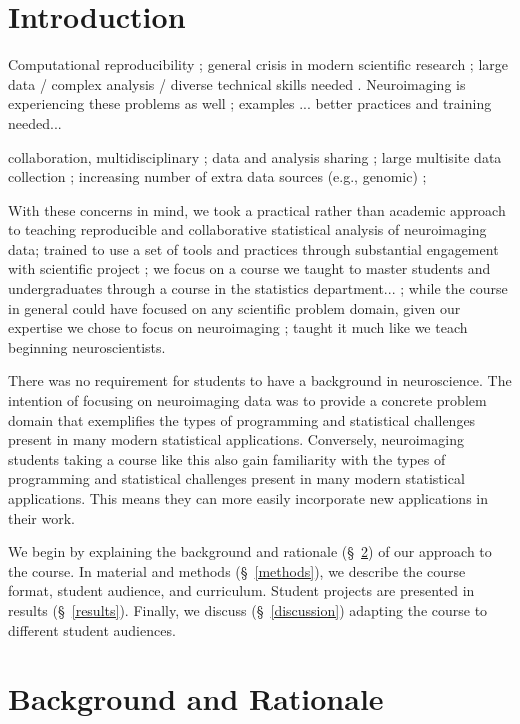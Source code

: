 \section{Introduction}

Computational reproducibility \citep{buckheit1995wavelab} ;
general crisis in modern scientific research ;
large data / complex analysis / diverse technical skills needed .
Neuroimaging is experiencing these problems as well ;
examples ...
better practices and training needed...

collaboration, multidisciplinary ;
data and analysis sharing ;
large multisite data collection ;
increasing number of extra data sources (e.g., genomic) ;

With these concerns in mind, we took a
practical rather than academic approach to teaching reproducible
and collaborative statistical analysis of neuroimaging data;
trained to use a set of tools and practices through substantial engagement
with scientific project ;
we focus on a course we taught to master students and undergraduates through
a course in the statistics department... ;
while the course in general could have focused on any scientific problem domain,
given our expertise we chose to focus on neuroimaging ;
taught it much like we teach beginning neuroscientists.

There was no requirement for students to have a background in neuroscience.
The intention of focusing on neuroimaging data was to provide a concrete problem
domain that exemplifies the types of programming and statistical challenges
present in many modern statistical applications.
Conversely, neuroimaging students taking a course like this also
gain familiarity with the types of programming and statistical challenges
present in many modern statistical applications.
This means they can more easily incorporate new applications
in their work.

We begin by explaining the background and rationale (\S~\ref{background}) of our approach to the course.
In material and methods (\S~\ref{methods}), we describe the course format, student audience,
and curriculum.
Student projects are presented in results (\S~\ref{results}).
Finally, we discuss (\S~\ref{discussion}) adapting the course to
different student audiences.

\section{Background and Rationale}\label{background}

